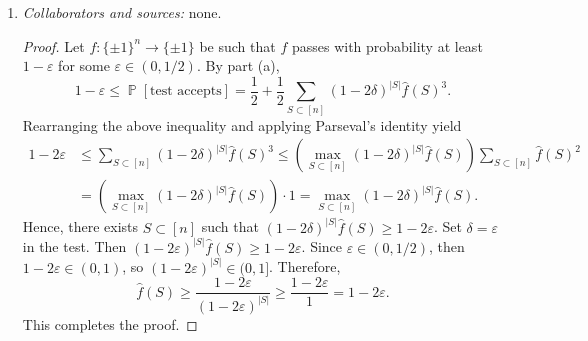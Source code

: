 \documentclass[letterpaper, reqno,11pt]{article}
\newcommand{\PP}{\mathop{{}\mathbb{P}}}
\begin{document}
\begin{enumerate}
\begin{enumerate}
    \begin{proof}
      Let $f : \{ \pm 1 \}^n \to \{ \pm 1 \}$ be a dictator function. Then $f = \chi_{\{ j \}}$ for some $j \in [n]$. Therefore, $\hat{f}(\{ j \}) = 1$ and $\hat{f}(S) = 0$ for all $S \subset [n]$ with $S \neq \{ j \}$. By part (a),
      \begin{align*}
        \PP[\text{test accepts}] &= \frac{1}{2} + \frac{1}{2} \sum_{S \subset [n]} (1 - 2\delta)^{|S|} \hat{f}(S)^3 \\
        &= \frac{1}{2} + \frac{1}{2} \left((1 - 2\delta)^{|\{ j \}|} \hat{f}(\{ j \})^3 + \sum_{\substack{S \subset [n] \\ S \neq \{ j \}}} (1 - 2\delta)^{|S|} \hat{f}(S)^3\right) \\
        &= \frac{1}{2} + \frac{1}{2} \left((1 - 2\delta)^1 \cdot 1^3 + \sum_{\substack{S \subset [n] \\ S \neq \{ j \}}} (1 - 2\delta)^{|S|} \cdot 0^3\right) \\
        &= \frac{1}{2} + \frac{1}{2} (1 - 2\delta) = 1 - \delta.
      \end{align*}
      This completes the proof.
    \end{proof}

    \clearpage

    \item \noindent\emph{Collaborators and sources:} none.
    
    \begin{proof}
      Let $f : \{ \pm 1 \}^n \to \{ \pm 1 \}$ be such that $f$ passes with probability at least $1 - \varepsilon$ for some $\varepsilon \in (0, 1/2)$. By part (a),
      $$ 1 - \varepsilon \leq \PP[\text{test accepts}] = \frac{1}{2} + \frac{1}{2} \sum_{S \subset [n]} (1 - 2\delta)^{|S|} \hat{f}(S)^3. $$
      Rearranging the above inequality and applying Parseval's identity yield
      \begin{align*}
        1 - 2\varepsilon &\leq \sum_{S \subset [n]} (1 - 2\delta)^{|S|} \hat{f}(S)^3 \leq \left(\max_{S \subset [n]} (1 - 2\delta)^{|S|} \hat{f}(S)\right) \sum_{S \subset [n]} \hat{f}(S)^2 \\
        &= \left(\max_{S \subset [n]} (1 - 2\delta)^{|S|} \hat{f}(S)\right) \cdot 1 = \max_{S \subset [n]} (1 - 2\delta)^{|S|} \hat{f}(S).
      \end{align*}
      Hence, there exists $S \subset [n]$ such that $(1 - 2\delta)^{|S|} \hat{f}(S) \geq 1 - 2\varepsilon$. Set $\delta = \varepsilon$ in the test. Then $(1 - 2\varepsilon)^{|S|} \hat{f}(S) \geq 1 - 2\varepsilon$. Since $\varepsilon \in (0, 1/2)$, then $1 - 2\varepsilon \in (0, 1)$, so $(1 - 2\varepsilon)^{|S|} \in (0, 1]$. Therefore,
      $$ \hat{f}(S) \geq \frac{1 - 2\varepsilon}{(1 - 2\varepsilon)^{|S|}} \geq \frac{1 - 2\varepsilon}{1} = 1 - 2\varepsilon. $$
      This completes the proof.
    \end{proof}


\end{enumerate}
\end{enumerate}
\end{document}
